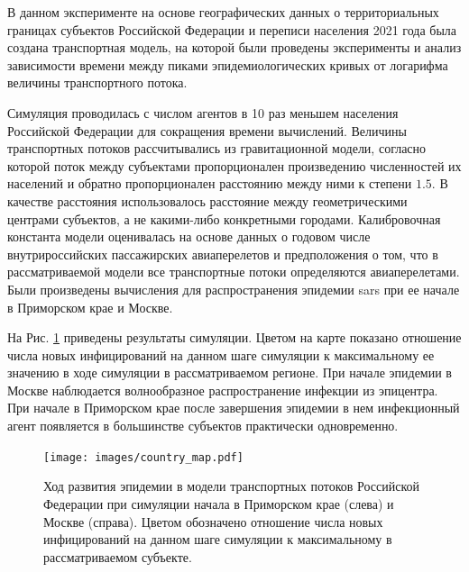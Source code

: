 \documentclass[a4paper,12pt]{article} %
\begin{document}
В данном эксперименте на основе географических данных о территориальных границах субъектов Российской Федерации и переписи населения 2021 года была создана транспортная модель, на которой были проведены эксперименты и анализ зависимости времени между пиками эпидемиологических кривых от логарифма величины транспортного потока.

Симуляция проводилась с числом агентов в 10 раз меньшем населения Российской Федерации для сокращения времени вычислений. Величины транспортных потоков рассчитывались из гравитационной модели, согласно которой поток между субъектами пропорционален произведению численностей их населений и обратно пропорционален расстоянию между ними к степени $1.5$. В качестве расстояния использовалось расстояние между геометрическими центрами субъектов, а не какими-либо конкретными городами. Калибровочная константа модели оценивалась на основе данных о годовом числе внутрироссийских пассажирских авиаперелетов и предположения о том, что в рассматриваемой модели все транспортные потоки определяются авиаперелетами. Были произведены вычисления для распространения эпидемии \gls{sars} при ее начале в Приморском крае и Москве.

На Рис. \ref{pic:country_map} приведены результаты симуляции. Цветом на карте показано отношение числа новых инфицирований на данном шаге симуляции к максимальному ее значению в ходе симуляции в рассматриваемом регионе. При начале эпидемии в Москве наблюдается волнообразное распространение инфекции из эпицентра. При начале в Приморском крае после завершения эпидемии в нем инфекционный агент появляется в большинстве субъектов практически одновременно. %



 \begin{figure}[H]
    \centering
    \texttt{[image: images/country\_map.pdf]}
    \caption{Ход развития эпидемии в модели транспортных потоков Российской Федерации при симуляции начала в Приморском крае (слева) и Москве (справа). Цветом обозначено отношение числа новых инфицирований на данном шаге симуляции к максимальному в рассматриваемом субъекте.}
    \label{pic:country_map}
\end{figure}
\end{document}
